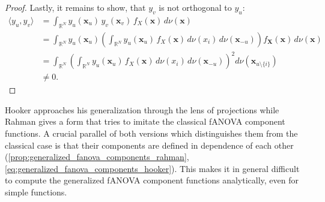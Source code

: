 \begin{proof}
Lastly, it remains to show, that $y_v$ is not orthogonal to $y_u$:
\begin{align*}
    \langle y_u, y_v \rangle
        &= \int_{\mathbb{R}^N} y_u(\boldsymbol{x}_u) \, y_v(\boldsymbol{x}_v) \, f_X(\boldsymbol{x}) \, d \nu(\boldsymbol{x}) \\
        &= \int_{\mathbb{R}^N} y_u(\boldsymbol{x}_u) 
           \left( \int_{\mathbb{R}^N} y_u(\boldsymbol{x}_u) \, f_X(\boldsymbol{x}) \, d \nu(x_i) \, d \nu(\boldsymbol{x}_{-u}) \right) 
           f_{\boldsymbol{X}}(\boldsymbol{x}) \, d \nu(\boldsymbol{x}) \\
        &= \int_{\mathbb{R}^N} 
           \left( \int_{\mathbb{R}^N} y_u(\boldsymbol{x}_u) \, f_X(\boldsymbol{x}) \, d \nu(x_i) \, d \nu(\boldsymbol{x}_{-u}) \right)^2 
           d \nu(\boldsymbol{x}_{u \setminus \{i\}}) \\
        &\neq 0.
\end{align*}
\end{proof}
Hooker approaches his generalization through the lens of projections while Rahman gives a form that tries to imitate the classical fANOVA component functions. A crucial parallel of both versions which distinguishes them from the classical case is that their components are defined in dependence of each other (\autoref{prop:generalized_fanova_components_rahman}, \autoref{eq:generalized_fanova_components_hooker}).
This makes it in general difficult to compute the generalized fANOVA component functions analytically, even for simple functions.
